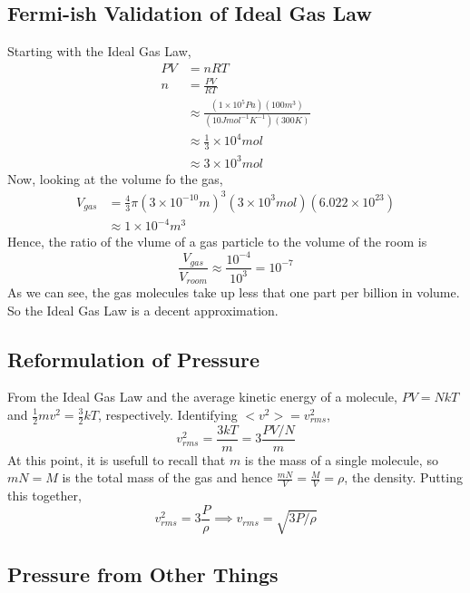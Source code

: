 \documentclass{article}
\begin{document}
\subsection{Fermi-ish Validation of Ideal Gas Law}

Starting with the Ideal Gas Law,
\begin{align*}
PV &= nRT \\
n &= \frac{PV}{RT} \\
&\approx \frac{(1\times10^5 Pa)(100 m^3)}{(10 J mol^{-1} K^{-1})(300 K)} \\
&\approx \frac{1}{3}\times10^4 mol \\
&\approx 3\times10^3 mol
\end{align*}
Now, looking at the volume fo the gas,
\begin{align*}
V_{gas} &= \frac{4}{3}\pi (3\times10^{-10} m)^3(3\times 10^3 mol)(6.022\times10^{23}) \\
&\approx 1\times10^{-4} m^3
\end{align*}
Hence, the ratio of the vlume of a gas particle to the volume of the room is
\begin{equation}
\frac{V_{gas}}{V_{room}} \approx \frac{10^{-4}}{10^3} = 10^{-7}
\end{equation}
As we can see, the gas molecules take up less that one part per billion in volume. So the Ideal Gas Law is a decent approximation.

\subsection{Reformulation of Pressure}

From the Ideal Gas Law and the average kinetic energy of a molecule, $PV = NkT$ and $\frac{1}{2} mv^2 = \frac{3}{2}kT$, respectively. Identifying $<v^2> = v_{rms}^2$,
\begin{equation}
v_{rms}^2 = \frac{3kT}{m} = 3\frac{PV/N}{m}
\end{equation}
At this point, it is usefull to recall that $m$ is the mass of a single molecule, so $mN=M$ is the total mass of the gas and hence $\frac{mN}{V} = \frac{M}{V} = \rho$, the density. Putting this together,
\begin{equation}
v_{rms}^2 = 3\frac{P}{\rho} \implies v_{rms} = \sqrt{3P/\rho}
\end{equation}

\subsection{Pressure from Other Things}
\end{document}
